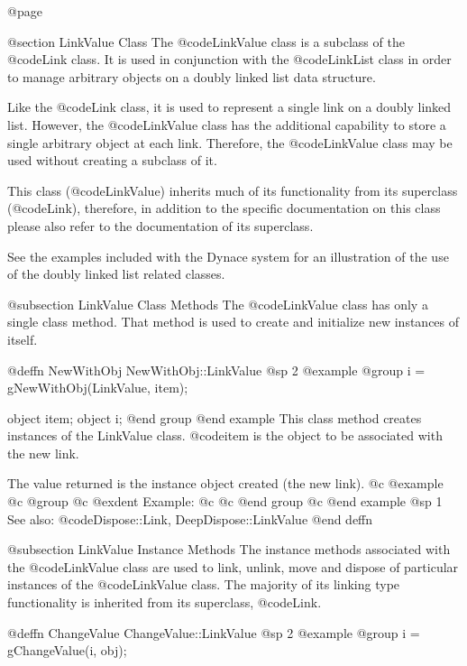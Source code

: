 @page

@section LinkValue Class
The @code{LinkValue} class is a subclass of the @code{Link} class.  It is
used in conjunction with the @code{LinkList} class in order to manage
arbitrary objects on a doubly linked list data structure.

Like the @code{Link} class, it is used to represent a single link on a
doubly linked list.  However, the @code{LinkValue} class has the
additional capability to store a single arbitrary object at each link.
Therefore, the @code{LinkValue} class may be used without creating a
subclass of it.

This class (@code{LinkValue}) inherits much of its functionality from its
superclass (@code{Link}), therefore, in addition to the specific
documentation on this class please also refer to the documentation of
its superclass.

See the examples included with the Dynace system for an illustration of the
use of the doubly linked list related classes.



@subsection LinkValue Class Methods
The @code{LinkValue} class has only a single class method.  That method
is used to create and initialize new instances of itself.




@deffn {NewWithObj} NewWithObj::LinkValue
@sp 2
@example
@group
i = gNewWithObj(LinkValue, item);

object  item;
object  i;
@end group
@end example
This class method creates instances of the LinkValue class.  @code{item}
is the object to be associated with the new link.  

The value returned is the instance object created (the new link).
@c @example
@c @group
@c @exdent Example:
@c 
@c @end group
@c @end example
@sp 1
See also:  @code{Dispose::Link, DeepDispose::LinkValue}
@end deffn






@subsection LinkValue Instance Methods
The instance methods associated with the @code{LinkValue} class are used to
link, unlink, move and dispose of particular instances of the
@code{LinkValue} class.  The majority of its linking type functionality
is inherited from its superclass, @code{Link}.








@deffn {ChangeValue} ChangeValue::LinkValue
@sp 2
@example
@group
i = gChangeValue(i, obj);

